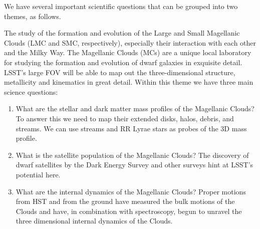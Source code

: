 We have several important scientific questions that can be grouped into two themes, as follows.


The study of the formation and
evolution of the Large and Small Magellanic Clouds (LMC and SMC,
respectively), especially their interaction with each other and the
Milky Way. The Magellanic Clouds (MCs) are a unique local laboratory
for studying the formation and evolution of dwarf galaxies in
exquisite detail.  LSST's large FOV will be able to map out the
three-dimensional structure, metallicity and kinematics in great
detail. Within this theme we have three main science questions:
\begin{enumerate}

\item What are the stellar and dark matter mass profiles of the
Magellanic Clouds?  To answer this we need to map their extended disks, halos, debris, and streams.  We can use
streams and RR Lyrae stars as probes of the 3D mass profile.

\item What is the satellite population of the Magellanic Clouds? The
discovery of dwarf satellites by the Dark Energy Survey and other
surveys hint at LSST's potential here.

\item What are the internal dynamics of the Magellanic Clouds?  Proper
motions from HST and from the ground have measured the bulk
motions of the Clouds and have, in combination with spectroscopy,
begun to unravel the three dimensional internal dynamics of the
Clouds.

\end{enumerate}


